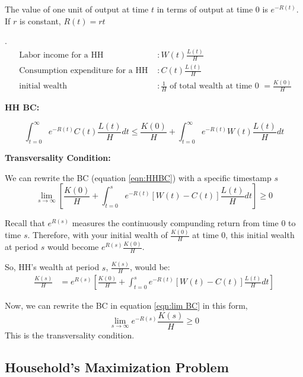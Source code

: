 \documentclass[12pt]{article}
\begin{document}
The value of one unit of output at time $ t $ in terms of output at time 0 is
$ e^{ - R(t)} $. If $ r $ is constant, $ R(t) = r t $


 $  $.
\begin{align*}
\text{ Labor income for a HH }&:W(t)\frac{L(t)}{H}\\
\text{ Consumption expenditure for a HH }&: C(t)\frac{L(t)}{H}\\
\text{ initial wealth }&: \frac{1}{H} \text{ of total wealth at time 0 }
= \frac{K(0)}{H}
\end{align*}



{\textbf {HH BC:}}

\begin{equation}
\label{eqn:HHBC}
\int_{t = 0}^{\infty } e^{ - R(t)}C(t)\frac{L(t)}{H}d t \le 
\frac{K(0)}{H} + \int_{t = 0}^{\infty } e^{ - R(t)} W(t)\frac{L(t)}{H} d t
\end{equation}

{\textbf {Transversality Condition:}}

We can rewrite the BC (equation \eqref{eqn:HHBC}) with a specific timestamp $ s $
\begin{equation}
		\label{eqn:lim BC}
\lim_{s \to \infty}\left[ 
		\frac{K(0)}{H} + \int_{t = 0}^{s} e^{ - R(t)}[W(t) - C(t)]\frac{L(t)}{H}d t
\right] \ge  0
\end{equation}


Recall that $ e^{R(s)} $ measures the continuously compunding return from time 0 to
time $ s $.
Therefore, with your initial wealth of $ \frac{K(0)}{H} $ at time 0, this initial 
wealth at period $ s $ would become $ e^{R(s)} \frac{K(0)}{H} $.

So, HH's wealth at period $ s $, $ \frac{K(s)}{H} $, would be:
\begin{align*}
\frac{K(s)}{H} &= e^{R(s)}
\left[ 
		\frac{K(0)}{H} + \int_{t = 0}^{s} e^{ - R(t)}[W(t) - C(t)]\frac{L(t)}{H}d t
\right] 
\end{align*}

Now, we can rewrite the BC in equation \eqref{eqn:lim BC} in this form,
\begin{equation*}
\lim_{s \to \infty}e^{ - R(s)}\frac{K(s)}{H} \ge 0
\end{equation*}
This is the transversality condition.


\subsection{Household's Maximization Problem}
\end{document}
